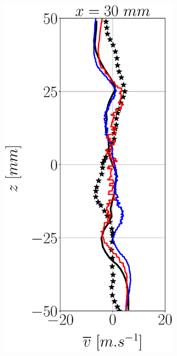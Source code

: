 \begin{figure}[h!]
\centering
\begin{subfigure}[b]{0.22\textwidth}
	\centering
   \includegraphics[scale=0.25]{./part3_applications/figures_ch7_aero/BIMER_validation_quantitative_lines/x30_w_vertical_mean.eps} 

\end{subfigure}
\end{figure}
